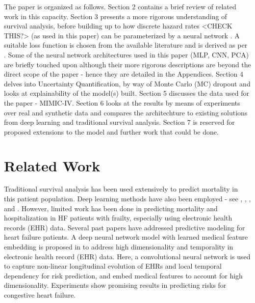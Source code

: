 \documentclass[%
 reprint,
 amsmath,amssymb,
 aps,
]{revtex4-2}
\begin{document}
The paper is organized as follows. Section 2 contains a brief review of related work in this capacity. Section 3 presents a more rigorous understanding of survival analysis, before building up to how discrete hazard rates \cite{Gensheimer_Narasimhan_2019} <CHECK THIS?> (as used in this paper) can be parameterized by a neural network \cite{kvamme_continuous_2019}. A suitable loss function is chosen from the available literature and is derived as per \cite{kvamme_continuous_2019}. Some of the neural network architectures used in this paper (MLP, CNN, PCA) are briefly touched upon although their more rigorous descriptions are beyond the direct scope of the paper - hence they are detailed in the Appendices. Section 4 delves into Uncertainty Quantification, by way of Monte Carlo (MC) dropout and looks at explainability of the model(s) built. Section 5 discusses the data used for the paper - MIMIC-IV. Section 6 looks at the results by means of experiments over real and synthetic data and compares the architechture to existing solutions from deep learning and traditional survival analysis. Section 7 is reserved for proposed extensions to the model and further work that could be done.

\section{\label{rescon}Related Work}
Traditional survival analysis has been used extensively to predict mortality in this patient population. Deep learning methods have also been employed - see \cite{e2edlgjoreski}, \cite{nirschl2018deep}, \cite{10.1001/jamanetworkopen.2019.6972}, \cite{asolares2020} and \cite{lorenzoni_2019}. However, limited work has been done in predicting mortality and hospitalization in HF patients with frailty, especially using electronic health records (EHR) data. Several past papers have addressed predictive modeling for heart failure patients. A deep neural network model with learned medical feature embedding is proposed in \cite{che2017} to address high dimensionality and temporality in electronic health record (EHR) data. Here, a convolutional neural network is used to capture non-linear longitudinal evolution of EHRs and local temporal dependency for risk prediction, and embed medical features to account for high dimensionality. Experiments show promising results in predicting risks for congestive heart failure.\\
\end{document}
